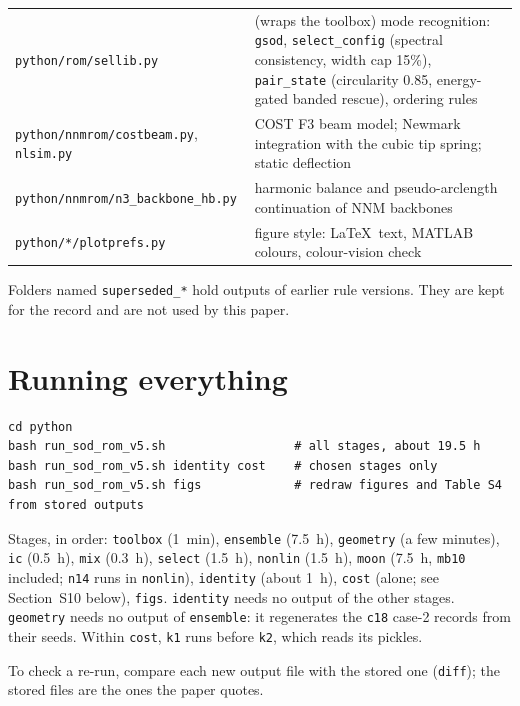 \documentclass[10pt]{article}
\newcommand{\f}[1]{\texttt{#1}}
\begin{document}
\begin{longtable}{L{0.30\textwidth}L{0.64\textwidth}}
\f{python/\allowbreak{}rom/\allowbreak{}sellib.py} & (wraps the toolbox) mode recognition: \f{gsod}, \f{select\_\allowbreak{}config} (spectral consistency, width cap 15\%), \f{pair\_\allowbreak{}state} (circularity 0.85, energy-gated banded rescue), ordering rules\\
\f{python/\allowbreak{}nnmrom/\allowbreak{}costbeam.py}, \f{nlsim.py} & COST F3 beam model; Newmark integration with the cubic tip spring; static deflection\\
\f{python/\allowbreak{}nnmrom/\allowbreak{}n3\_\allowbreak{}backbone\_\allowbreak{}hb.py} & harmonic balance and pseudo-arclength continuation of NNM backbones\\
\f{python/\allowbreak{}*/\allowbreak{}plotprefs.py} & figure style: \LaTeX\ text, MATLAB colours, colour-vision check\\
\bottomrule
\end{longtable}
Folders named \f{superseded\_\allowbreak{}*} hold outputs of earlier rule versions. They are kept for the record and are not used by this paper.

\section{Running everything}
\begin{verbatim}
cd python
bash run_sod_rom_v5.sh                  # all stages, about 19.5 h
bash run_sod_rom_v5.sh identity cost    # chosen stages only
bash run_sod_rom_v5.sh figs             # redraw figures and Table S4 from stored outputs
\end{verbatim}
Stages, in order: \f{toolbox} (1~min), \f{ensemble} (7.5~h), \f{geometry} (a few minutes), \f{ic} (0.5~h), \f{mix} (0.3~h), \f{select} (1.5~h), \f{nonlin} (1.5~h), \f{moon} (7.5~h, \f{mb10} included; \f{n14} runs in \f{nonlin}), \f{identity} (about 1~h), \f{cost} (alone; see Section~S10 below), \f{figs}.
\f{identity} needs no output of the other stages.
\f{geometry} needs no output of \f{ensemble}: it regenerates the \f{c18} case-2 records from their seeds.
Within \f{cost}, \f{k1} runs before \f{k2}, which reads its pickles.

To check a re-run, compare each new output file with the stored one (\f{diff}); the stored files are the ones the paper quotes.
\end{document}
